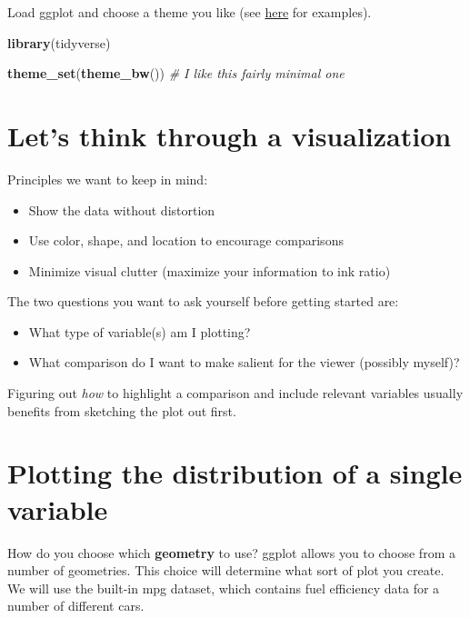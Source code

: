 \documentclass[
  12pt,
]{book}
\newenvironment{Shaded}{\begin{snugshade}}{\end{snugshade}}
\newcommand{\CommentTok}[1]{\textcolor[rgb]{0.56,0.35,0.01}{\textit{#1}}}
\newcommand{\FunctionTok}[1]{\textcolor[rgb]{0.13,0.29,0.53}{\textbf{#1}}}
\newcommand{\NormalTok}[1]{#1}
\providecommand{\tightlist}{%
  \setlength{\itemsep}{0pt}\setlength{\parskip}{0pt}}
\begin{document}
Load ggplot and choose a theme you like (see \href{https://bookdown.org/asmundhreinn/r4ds-master/graphics-for-communication.html\#themes}{here} for examples).

\begin{Shaded}
\begin{Highlighting}[]
\FunctionTok{library}\NormalTok{(tidyverse)}

\FunctionTok{theme\_set}\NormalTok{(}\FunctionTok{theme\_bw}\NormalTok{()) }\CommentTok{\# I like this fairly minimal one}
\end{Highlighting}
\end{Shaded}

\hypertarget{lets-think-through-a-visualization}{%
\section{Let's think through a visualization}\label{lets-think-through-a-visualization}}

Principles we want to keep in mind:

\begin{itemize}
\tightlist
\item
  Show the data without distortion
\item
  Use color, shape, and location to encourage comparisons
\item
  Minimize visual clutter (maximize your information to ink ratio)
\end{itemize}

The two questions you want to ask yourself before getting started are:

\begin{itemize}
\tightlist
\item
  What type of variable(s) am I plotting?
\item
  What comparison do I want to make salient for the viewer (possibly myself)?
\end{itemize}

Figuring out \emph{how} to highlight a comparison and include relevant variables usually benefits from sketching the plot out first.

\hypertarget{plotting-the-distribution-of-a-single-variable}{%
\section{Plotting the distribution of a single variable}\label{plotting-the-distribution-of-a-single-variable}}

How do you choose which \textbf{geometry} to use? ggplot allows you to choose from a number of geometries. This choice will determine what sort of plot you create. We will use the built-in mpg dataset, which contains fuel efficiency data for a number of different cars.
\end{document}
